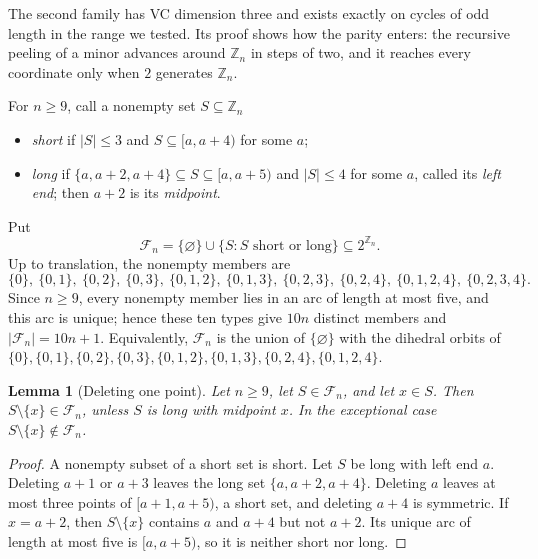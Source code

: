 \documentclass[11pt]{article}
\newtheorem{lemma}[theorem]{Lemma}
\theoremstyle{definition}
\theoremstyle{remark}
\begin{document}
The second family has VC dimension three and exists exactly on cycles of
odd length in the range we tested. Its proof shows how the parity enters:
the recursive peeling of a minor advances around \(\mathbb Z_n\) in steps
of two, and it reaches every coordinate only when \(2\) generates
\(\mathbb Z_n\).

For \(n\ge9\), call a nonempty set \(S\subseteq\mathbb Z_n\)
\begin{itemize}[leftmargin=2em]
  \item \emph{short} if \(|S|\le3\) and \(S\subseteq[a,a+4)\) for some
        \(a\);
  \item \emph{long} if \(\{a,a+2,a+4\}\subseteq S\subseteq[a,a+5)\) and
        \(|S|\le4\) for some \(a\), called its \emph{left end}; then
        \(a+2\) is its \emph{midpoint}.
\end{itemize}
Put
\begin{equation}
 \mathcal F_n=\{\varnothing\}\cup\{S:S\text{ short or long}\}
 \subseteq2^{\mathbb Z_n}.
 \label{eq:step-two-family}
\end{equation}
Up to translation, the nonempty members are
\[
 \{0\},\ \{0,1\},\ \{0,2\},\ \{0,3\},\ \{0,1,2\},\ \{0,1,3\},\ \{0,2,3\},\
 \{0,2,4\},\ \{0,1,2,4\},\ \{0,2,3,4\}.
\]
Since \(n\ge9\), every nonempty member lies in an arc of length at most
five, and this arc is unique; hence these ten types give
\(10n\) distinct members and \(|\mathcal F_n|=10n+1\).  Equivalently,
\(\mathcal F_n\) is the union of \(\{\varnothing\}\) with the dihedral
orbits of \(\{0\},\{0,1\},\{0,2\},\{0,3\},\{0,1,2\},\{0,1,3\},
\{0,2,4\},\{0,1,2,4\}\).

\begin{lemma}[Deleting one point]
\label{lem:step-two-deletion}
Let \(n\ge9\), let \(S\in\mathcal F_n\), and let \(x\in S\).  Then
\(S\setminus\{x\}\in\mathcal F_n\), unless \(S\) is long with midpoint
\(x\).  In the exceptional case \(S\setminus\{x\}\notin\mathcal F_n\).
\end{lemma}

\begin{proof}
A nonempty subset of a short set is short.  Let \(S\) be long with left end
\(a\).  Deleting \(a+1\) or \(a+3\) leaves the long set
\(\{a,a+2,a+4\}\).  Deleting \(a\) leaves at most three points of
\([a+1,a+5)\), a short set, and deleting \(a+4\) is symmetric.  If
\(x=a+2\), then \(S\setminus\{x\}\) contains \(a\) and \(a+4\) but not
\(a+2\).  Its unique arc of length at most five is \([a,a+5)\), so it is
neither short nor long.
\end{proof}
\end{document}
